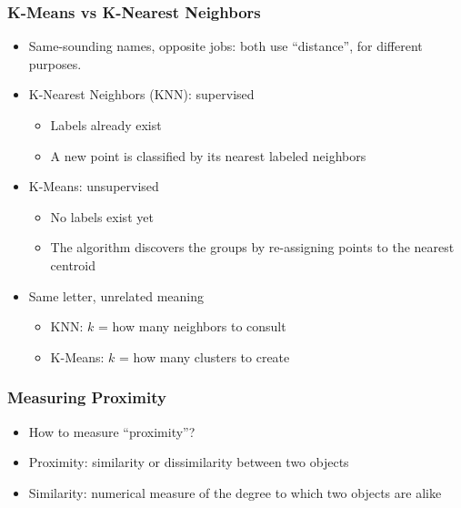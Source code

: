 


\begin{frame}[fragile]\frametitle{K-Means vs K-Nearest Neighbors}
\begin{itemize}
\item Same-sounding names, opposite jobs: both use ``distance'', for different purposes.
\item K-Nearest Neighbors (KNN): supervised
\begin{itemize}
\item Labels already exist
\item A new point is classified by its nearest labeled neighbors
\end{itemize}
\item K-Means: unsupervised
\begin{itemize}
\item No labels exist yet
\item The algorithm discovers the groups by re-assigning points to the nearest centroid
\end{itemize}
\item Same letter, unrelated meaning
\begin{itemize}
\item KNN: $k$ = how many neighbors to consult
\item K-Means: $k$ = how many clusters to create
\end{itemize}
\end{itemize}
\end{frame}



\begin{frame}[fragile]\frametitle{Measuring Proximity}
\begin{itemize}
\item How to measure ``proximity''?
\item Proximity: similarity or dissimilarity between two objects
\item Similarity: numerical measure of the degree to which two objects are alike

\end{itemize}

\end{frame}


